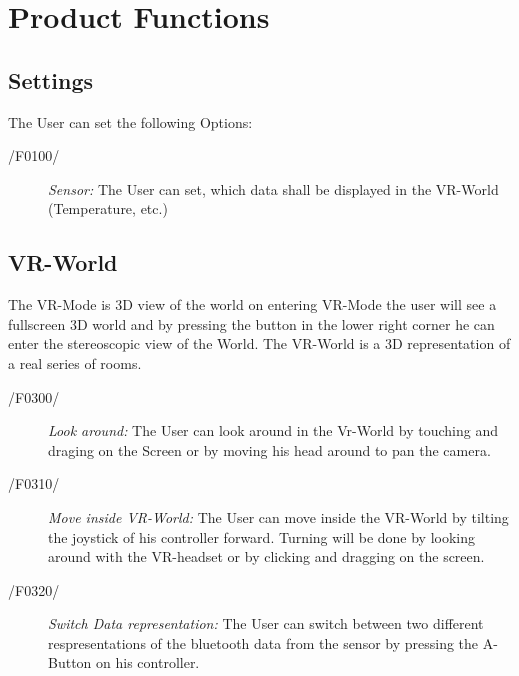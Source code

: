 \section{Product Functions}


\subsection{Settings}
  The User can set the following Options:
  \begin{description}
    \item[/F0100/]
  	\textit{Sensor:} The User can set, which data shall be displayed in the VR-World (Temperature, etc.)
  \end{description}

\subsection{VR-World}
  The VR-Mode is 3D view of the world on entering VR-Mode the user will see a fullscreen 3D world and by pressing the button in the lower right corner he can enter the  stereoscopic view of the World.
  The VR-World is a 3D representation of a real series of rooms.
  \begin{description}
    \item[/F0300/]
      \textit{Look around:} The User can look around in the Vr-World by touching and draging on the Screen or by moving his head around to pan the camera.
  \end{description}

  \begin{description}
    \item[/F0310/]

      \textit{Move inside VR-World:} The User can move inside the VR-World by tilting the joystick of his controller forward. Turning will be done by looking around with the VR-headset
                                    or by clicking and dragging on the screen.
  \end{description}

  \begin{description}
    \item[/F0320/]
      \textit{Switch Data representation:} The User can switch between two different respresentations of the bluetooth data from the sensor by pressing the A-Button on his controller.
  \end{description}

